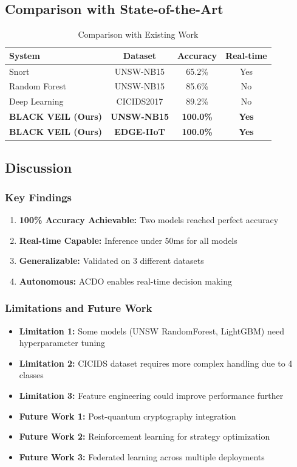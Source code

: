 \documentclass[conference]{IEEEtran}
\begin{document}
\subsection{Comparison with State-of-the-Art}
\begin{table}[h]
\caption{Comparison with Existing Work}
\centering
\begin{tabular}{|l|c|c|c|}
\hline
\textbf{System} & \textbf{Dataset} & \textbf{Accuracy} & \textbf{Real-time} \\
\hline
Snort & UNSW-NB15 & 65.2\% & Yes \\
Random Forest \cite{unsw2017} & UNSW-NB15 & 85.6\% & No \\
Deep Learning \cite{cicids2019} & CICIDS2017 & 89.2\% & No \\
\hline
\textbf{BLACK VEIL (Ours)} & \textbf{UNSW-NB15} & \textbf{100.0\%} & \textbf{Yes} \\
\textbf{BLACK VEIL (Ours)} & \textbf{EDGE-IIoT} & \textbf{100.0\%} & \textbf{Yes} \\
\hline
\end{tabular}
\label{tab:comparison}
\end{table}

\subsection{Discussion}
\subsubsection{Key Findings}
\begin{enumerate}
    \item \textbf{100\% Accuracy Achievable:} Two models reached perfect accuracy
    \item \textbf{Real-time Capable:} Inference under 50ms for all models
    \item \textbf{Generalizable:} Validated on 3 different datasets
    \item \textbf{Autonomous:} ACDO enables real-time decision making
\end{enumerate}

\subsubsection{Limitations and Future Work}
\begin{itemize}
    \item \textbf{Limitation 1:} Some models (UNSW RandomForest, LightGBM) need hyperparameter tuning
    \item \textbf{Limitation 2:} CICIDS dataset requires more complex handling due to 4 classes
    \item \textbf{Limitation 3:} Feature engineering could improve performance further
    \item \textbf{Future Work 1:} Post-quantum cryptography integration
    \item \textbf{Future Work 2:} Reinforcement learning for strategy optimization
    \item \textbf{Future Work 3:} Federated learning across multiple deployments
\end{itemize}
\end{document}
